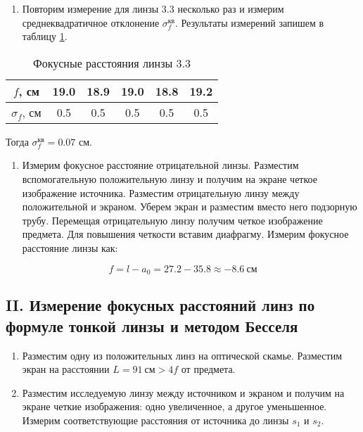 \documentclass[a4paper,12pt]{article}
\begin{document}
\begin{enumerate}[resume]
    \item Повторим измерение для линзы 3.3 несколько раз и измерим среднеквадратичное отклонение $\sigma_f^\text{кв}$. Результаты измерений запишем в таблицу \ref{table:2}.
\end{enumerate}

\begin{table}[!h]
	\caption{Фокусные расстояния линзы 3.3}
	\label{table:2}	
	\begin{center}
		\begin{tabular}{|c|c|c|c|c|c|}
			\hline
			$f$, см & 19.0 & 18.9 & 19.0 & 18.8 & 19.2 \\ \hline
			$\sigma_f$, см & 0.5 & 0.5 & 0.5 & 0.5 & 0.5 \\ \hline
		\end{tabular}
	\end{center}
\end{table}


Тогда $\sigma_f^\text{кв} = 0.07$ см.

\begin{enumerate}[resume]
    \item Измерим фокусное расстояние отрицательной линзы. Разместим вспомогательную положительную линзу и получим на экране четкое изображение источника. Разместим отрицательную линзу между положительной и экраном. Уберем экран и разместим вместо него подзорную трубу. Перемещая отрицательную линзу получим четкое изображение предмета. Для повышения четкости вставим диафрагму. Измерим фокусное расстояние линзы как:
\end{enumerate}

\begin{equation*}
    f = l - a_0 = 27.2 - 35.8 \approx -8.6 \ \text{см}
\end{equation*}

\subsection*{II. Измерение фокусных расстояний линз по формуле тонкой линзы и методом Бесселя}

\begin{enumerate}
    \item Разместим одну из положительных линз на оптической скамье. Разместим экран на расстоянии $L = 91 \ \text{см} > 4f$ от предмета.
    \item Разместим исследуемую линзу между источником и экраном и получим на экране четкие изображения: одно увеличенное, а другое уменьшенное. Измерим соответствующие расстояния от источника до линзы $s_1$ и $s_2$.
\end{enumerate}
\end{document}
